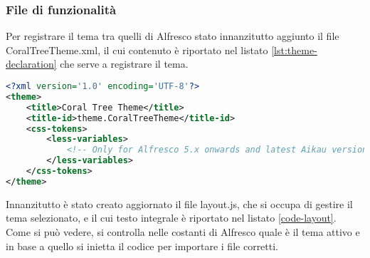 \subsubsection{File di funzionalità}
Per registrare il tema tra quelli di Alfresco stato innanzitutto aggiunto il file CoralTreeTheme.xml, il cui contenuto è riportato nel listato \ref{lst:theme-declaration} che serve a registrare il tema.
\begin{lstlisting}[language=XML, caption=XML della dichiarazione del tema, label=lst:theme-declaration]
<?xml version='1.0' encoding='UTF-8'?>
<theme>
    <title>Coral Tree Theme</title>
    <title-id>theme.CoralTreeTheme</title-id>
    <css-tokens>
        <less-variables>
            <!-- Only for Alfresco 5.x onwards and latest Aikau version -->
        </less-variables>
    </css-tokens>
</theme>
\end{lstlisting}
Innanzitutto è stato creato aggiornato il file layout.js, che si occupa di gestire il tema selezionato, e il cui testo integrale è riportato nel listato \ref{code-layout}. Come si può vedere, si controlla nelle costanti di Alfresco quale è il tema attivo e in base a quello si inietta il codice per importare i file corretti.
